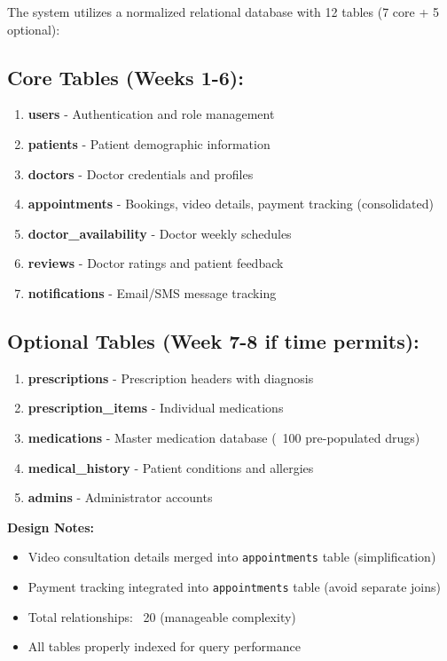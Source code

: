 \documentclass[11pt,a4paper]{article}
\begin{document}
The system utilizes a normalized relational database with 12 tables (7 core + 5 optional):

\subsection*{Core Tables (Weeks 1-6):}
\begin{enumerate}[leftmargin=*, itemsep=0.1em]
    \item \textbf{users} - Authentication and role management
    \item \textbf{patients} - Patient demographic information
    \item \textbf{doctors} - Doctor credentials and profiles
    \item \textbf{appointments} - Bookings, video details, payment tracking (consolidated)
    \item \textbf{doctor\_availability} - Doctor weekly schedules
    \item \textbf{reviews} - Doctor ratings and patient feedback
    \item \textbf{notifications} - Email/SMS message tracking
\end{enumerate}

\subsection*{Optional Tables (Week 7-8 if time permits):}
\begin{enumerate}[leftmargin=*, itemsep=0.1em]
    \item \textbf{prescriptions} - Prescription headers with diagnosis
    \item \textbf{prescription\_items} - Individual medications
    \item \textbf{medications} - Master medication database (~100 pre-populated drugs)
    \item \textbf{medical\_history} - Patient conditions and allergies
    \item \textbf{admins} - Administrator accounts
\end{enumerate}

\textbf{Design Notes:}
\begin{itemize}[leftmargin=*, itemsep=0.05em]
    \item Video consultation details merged into \texttt{appointments} table (simplification)
    \item Payment tracking integrated into \texttt{appointments} table (avoid separate joins)
    \item Total relationships: ~20 (manageable complexity)
    \item All tables properly indexed for query performance
\end{itemize}
\end{document}
